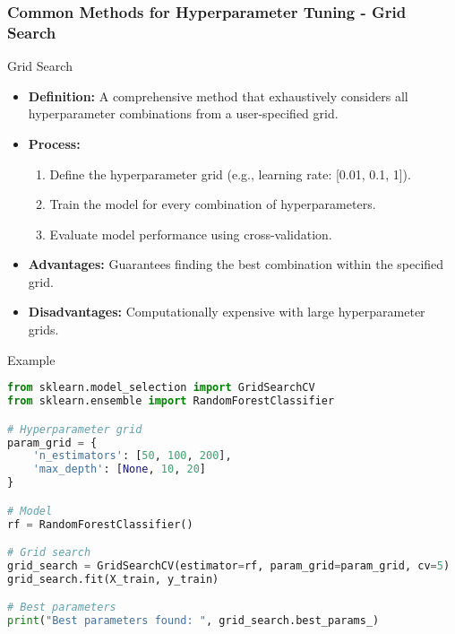 \documentclass[aspectratio=169]{beamer}
\begin{document}
\begin{frame}[fragile]
    \frametitle{Common Methods for Hyperparameter Tuning - Grid Search}
    \begin{block}{Grid Search}
        \begin{itemize}
            \item \textbf{Definition:} A comprehensive method that exhaustively considers all hyperparameter combinations from a user-specified grid.
            \item \textbf{Process:}
            \begin{enumerate}
                \item Define the hyperparameter grid (e.g., learning rate: [0.01, 0.1, 1]).
                \item Train the model for every combination of hyperparameters.
                \item Evaluate model performance using cross-validation.
            \end{enumerate}
            \item \textbf{Advantages:} Guarantees finding the best combination within the specified grid.
            \item \textbf{Disadvantages:} Computationally expensive with large hyperparameter grids.
        \end{itemize}
    \end{block}
    
    \begin{block}{Example}
        \begin{lstlisting}[language=Python]
from sklearn.model_selection import GridSearchCV
from sklearn.ensemble import RandomForestClassifier

# Hyperparameter grid
param_grid = {
    'n_estimators': [50, 100, 200],
    'max_depth': [None, 10, 20]
}

# Model
rf = RandomForestClassifier()

# Grid search
grid_search = GridSearchCV(estimator=rf, param_grid=param_grid, cv=5)
grid_search.fit(X_train, y_train)

# Best parameters
print("Best parameters found: ", grid_search.best_params_)
        \end{lstlisting}
    \end{block}
\end{frame}
\end{document}
